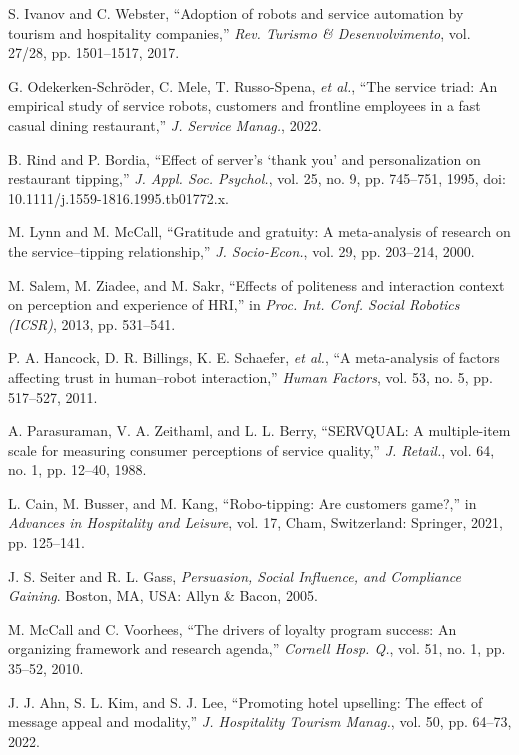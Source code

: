 \documentclass[conference]{IEEEtran}
\begin{document}
\begin{thebibliography}{35}

 S. Ivanov and C. Webster, “Adoption of robots and service automation by tourism and hospitality companies,” \textit{Rev. Turismo \& Desenvolvimento}, vol. 27/28, pp. 1501–1517, 2017.

 G. Odekerken-Schröder, C. Mele, T. Russo-Spena, \textit{et al.}, “The service triad: An empirical study of service robots, customers and frontline employees in a fast casual dining restaurant,” \textit{J. Service Manag.}, 2022.

 B. Rind and P. Bordia, “Effect of server’s ‘thank you’ and personalization on restaurant tipping,” \textit{J. Appl. Soc. Psychol.}, vol. 25, no. 9, pp. 745–751, 1995, doi: 10.1111/j.1559-1816.1995.tb01772.x.

 M. Lynn and M. McCall, “Gratitude and gratuity: A meta-analysis of research on the service–tipping relationship,” \textit{J. Socio-Econ.}, vol. 29, pp. 203–214, 2000.

 M. Salem, M. Ziadee, and M. Sakr, “Effects of politeness and interaction context on perception and experience of HRI,” in \textit{Proc. Int. Conf. Social Robotics (ICSR)}, 2013, pp. 531–541.

 P. A. Hancock, D. R. Billings, K. E. Schaefer, \textit{et al.}, “A meta-analysis of factors affecting trust in human–robot interaction,” \textit{Human Factors}, vol. 53, no. 5, pp. 517–527, 2011.

 A. Parasuraman, V. A. Zeithaml, and L. L. Berry, “SERVQUAL: A multiple-item scale for measuring consumer perceptions of service quality,” \textit{J. Retail.}, vol. 64, no. 1, pp. 12–40, 1988.

 L. Cain, M. Busser, and M. Kang, “Robo-tipping: Are customers game?,” in \textit{Advances in Hospitality and Leisure}, vol. 17, Cham, Switzerland: Springer, 2021, pp. 125–141.

 J. S. Seiter and R. L. Gass, \textit{Persuasion, Social Influence, and Compliance Gaining}. Boston, MA, USA: Allyn \& Bacon, 2005.

 M. McCall and C. Voorhees, “The drivers of loyalty program success: An organizing framework and research agenda,” \textit{Cornell Hosp. Q.}, vol. 51, no. 1, pp. 35–52, 2010.

 J. J. Ahn, S. L. Kim, and S. J. Lee, “Promoting hotel upselling: The effect of message appeal and modality,” \textit{J. Hospitality Tourism Manag.}, vol. 50, pp. 64–73, 2022.


\end{thebibliography}
\end{document}
